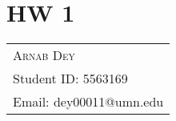 \section{HW 1}
\begin{tabularx}{\textwidth}{l}
	\hspace*{-0.8cm}\large\textsc{Arnab Dey}\\
	\hspace*{-0.8cm}Student ID: 5563169\\
	\hspace*{-0.8cm}Email: dey00011@umn.edu\\
\end{tabularx}
\bigskip
\par